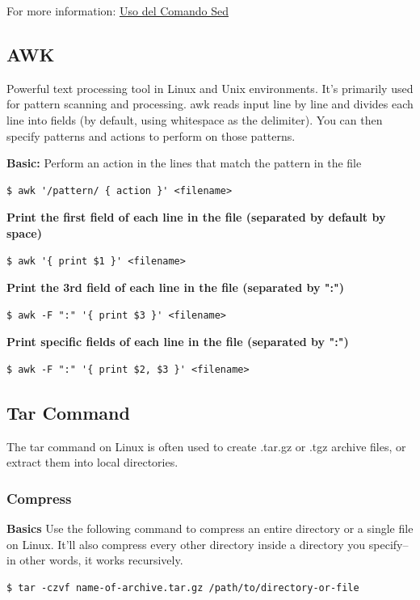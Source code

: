 \documentclass{article}
\newenvironment{codetemplate}[1][]{%
  \mybasecolorbox[#1]
  \itshape
}{%
  \endmybasecolorbox
}
\begin{document}
For more information:
\href{https://www.ochobitshacenunbyte.com/2019/05/28/uso-del-comando-sed-en-linux-y-unix-con-ejemplos/}{Uso del Comando Sed} 

\subsection{AWK}
Powerful text processing tool in Linux and Unix environments. It's primarily used for pattern scanning and processing. awk reads input line by line and divides each line into fields (by default, using whitespace as the delimiter). You can then specify patterns and actions to perform on those patterns.

\textbf{Basic:} Perform an action in the lines that match the pattern in the file
\begin{codetemplate}{}
\begin{verbatim}
$ awk '/pattern/ { action }' <filename>
\end{verbatim}
\end{codetemplate}

\textbf{Print the first field of each line in the file (separated by default by space)}
\begin{codetemplate}{}
\begin{verbatim}
$ awk '{ print $1 }' <filename>
\end{verbatim}
\end{codetemplate}

\textbf{Print the 3rd field of each line in the file (separated by ":")}
\begin{codetemplate}{}
\begin{verbatim}
$ awk -F ":" '{ print $3 }' <filename>
\end{verbatim}
\end{codetemplate}

\textbf{Print specific fields of each line in the file (separated by ":")}
\begin{codetemplate}{}
\begin{verbatim}
$ awk -F ":" '{ print $2, $3 }' <filename>
\end{verbatim}
\end{codetemplate}

\subsection{Tar Command}
The tar command on Linux is often used to create .tar.gz or .tgz archive files, or extract them into local directories.
\subsubsection{Compress}
\textbf{Basics}
\newline
Use the following command to compress an entire directory or a single file on Linux. It’ll also compress every other directory inside a directory you specify–in other words, it works recursively.
\begin{codetemplate}{}
\begin{verbatim}
$ tar -czvf name-of-archive.tar.gz /path/to/directory-or-file
\end{verbatim}
\end{codetemplate}
\end{document}
